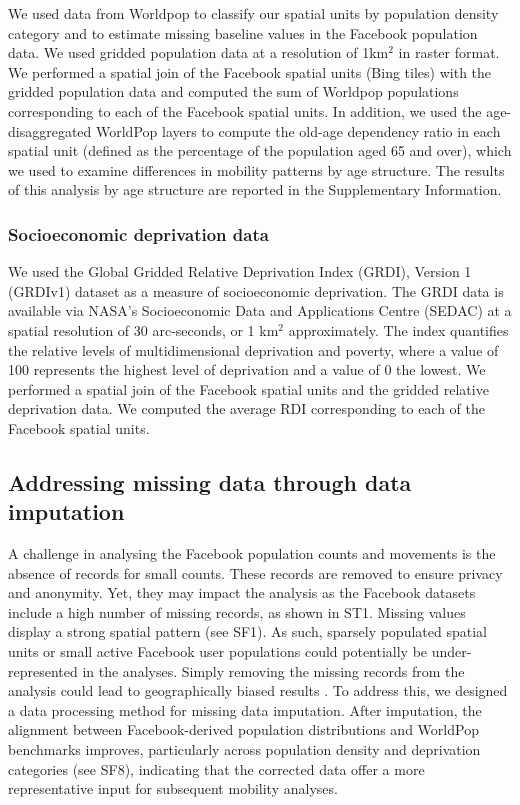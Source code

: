 \documentclass[fleqn,10pt]{wlscirep}
\begin{document}
We used data from Worldpop \cite{tatem2017} to classify our spatial units by population density category and to estimate missing baseline values in the Facebook population data.
We used gridded population data at a resolution of 1km$^2$ in raster format. We performed a spatial join of the Facebook spatial units (Bing tiles) with the gridded population data and computed the sum of Worldpop populations corresponding to each of the Facebook spatial units. In addition, we used the age-disaggregated WorldPop layers to compute the old-age dependency ratio in each spatial unit (defined as the percentage of the population aged 65 and over), which we used to examine differences in mobility patterns by age structure. The results of this analysis by age structure are reported in the Supplementary Information.

\subsubsection*{Socioeconomic deprivation data} 

We used the Global Gridded Relative Deprivation Index (GRDI), Version 1 (GRDIv1) \cite{RDI2022} dataset as a measure of socioeconomic deprivation.
The GRDI data is available via NASA's Socioeconomic Data and Applications Centre (SEDAC) at a spatial resolution of 30 arc-seconds, or 1 km$^2$ approximately.
The index quantifies the relative levels of multidimensional deprivation and poverty, where a value of 100 represents the highest level of deprivation and a value of 0 the lowest.
We performed a spatial join of the Facebook spatial units and the gridded relative deprivation data. We computed the average RDI corresponding to each of the Facebook spatial units.


\subsection*{Addressing missing data through data imputation} 

A challenge in analysing the Facebook population counts and movements is the absence of records for small counts. These records are removed to ensure privacy and anonymity. Yet, they may impact the analysis as the Facebook datasets include a high number of missing records, as shown in ST1. Missing values display a strong spatial pattern (see SF1). As such, sparsely populated spatial units or small active Facebook user populations could potentially be under-represented in the analyses. Simply removing the missing records from the analysis could lead to geographically biased results \cite{afghari2019}. To address this, we designed a data processing method for missing data imputation. After imputation, the alignment between Facebook-derived population distributions and WorldPop benchmarks improves, particularly across population density and deprivation categories (see SF8), indicating that the corrected data offer a more representative input for subsequent mobility analyses.
\end{document}
